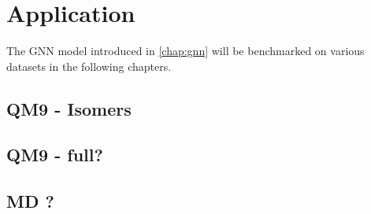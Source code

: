 \chapter{Application}
\label{chap:application}
The GNN model introduced in \autoref{chap:gnn} will be benchmarked on various datasets in the following chapters. 

\section{QM9 -  Isomers}
\label{sec:qm9_isomers_benchmark}

\section{QM9 - full?}
\label{sec:qm9_isomers_benchmark}

\section{MD ? }
\label{sec:qm9_isomers_benchmark}
